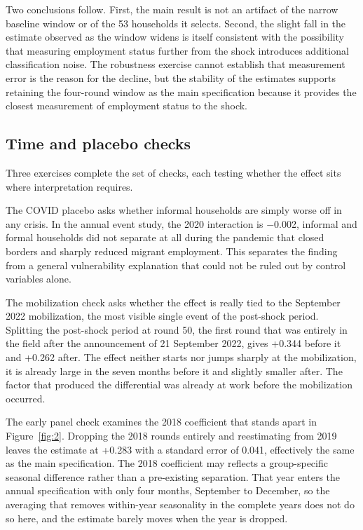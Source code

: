 Two conclusions follow. First, the main result is not an artifact of the narrow baseline window or of the 53 households it selects. Second, the slight fall in the estimate observed as the window widens is itself consistent with the possibility that measuring employment status further from the shock introduces additional classification noise. The robustness exercise cannot establish that measurement error is the reason for the decline, but the stability of the estimates supports retaining the four-round window as the main specification because it provides the closest measurement of employment status to the shock.

\subsection{Time and placebo checks}\label{sec:8-5}

Three exercises complete the set of checks, each testing whether the effect sits where interpretation requires.

The COVID placebo asks whether informal households are simply worse off in any crisis. In the annual event study, the 2020 interaction is $-$0.002, informal and formal households did not separate at all during the pandemic that closed borders and sharply reduced migrant employment. This separates the finding from a general vulnerability explanation that could not be ruled out by control variables alone.

The mobilization check asks whether the effect is really tied to the September 2022 mobilization, the most visible single event of the post-shock period. Splitting the post-shock period at round 50, the first round that was entirely in the field after the announcement of 21 September 2022, gives +0.344 before it and +0.262 after. The effect neither starts nor jumps sharply at the mobilization, it is already large in the seven months before it and slightly smaller after. The factor that produced the differential was already at work before the mobilization occurred.

The early panel check examines the 2018 coefficient that stands apart in Figure~\ref{fig:2}. Dropping the 2018 rounds entirely and reestimating from 2019 leaves the estimate at +0.283 with a standard error of 0.041, effectively the same as the main specification. The 2018 coefficient may reflects a group-specific seasonal difference rather than a pre-existing separation. That year enters the annual specification with only four months, September to December, so the averaging that removes within-year seasonality in the complete years does not do so here, and the estimate barely moves when the year is dropped.

